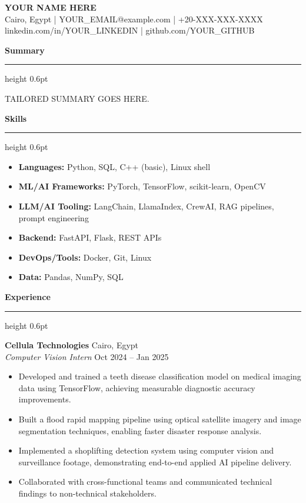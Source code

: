 \documentclass[10pt,a4paper]{article}
\newcommand{\href}[2]{#2}
\newcommand{\cvsection}[1]{%
  \vspace{2pt}%
  {\large\bfseries #1}\\[-4pt]%
  \hrule height 0.6pt%
  \vspace{2pt}%
}
\begin{document}
\small

\begin{center}
  {\LARGE\bfseries YOUR NAME HERE}\\[3pt]
  Cairo, Egypt \quad|\quad
  \href{mailto:YOUR_EMAIL@example.com}{YOUR\_EMAIL@example.com} \quad|\quad
  +20-XXX-XXX-XXXX \\
  \href{https://linkedin.com/in/YOUR_LINKEDIN}{linkedin.com/in/YOUR\_LINKEDIN} \quad|\quad
  \href{https://github.com/YOUR_GITHUB}{github.com/YOUR\_GITHUB}
\end{center}

\vspace{2pt}

\cvsection{Summary}


TAILORED SUMMARY GOES HERE.

\cvsection{Skills}

\begin{itemize}
  \item \textbf{Languages:} Python, SQL, C++ (basic), Linux shell
  \item \textbf{ML/AI Frameworks:} PyTorch, TensorFlow, scikit-learn, OpenCV
  \item \textbf{LLM/AI Tooling:} LangChain, LlamaIndex, CrewAI, RAG pipelines, prompt engineering
  \item \textbf{Backend:} FastAPI, Flask, REST APIs
  \item \textbf{DevOps/Tools:} Docker, Git, Linux
  \item \textbf{Data:} Pandas, NumPy, SQL
\end{itemize}

\cvsection{Experience}

\textbf{Cellula Technologies} \hfill Cairo, Egypt\\
\textit{Computer Vision Intern} \hfill Oct 2024 -- Jan 2025
\begin{itemize}
  \item Developed and trained a teeth disease classification model on medical imaging data using TensorFlow, achieving measurable diagnostic accuracy improvements.
  \item Built a flood rapid mapping pipeline using optical satellite imagery and image segmentation techniques, enabling faster disaster response analysis.
  \item Implemented a shoplifting detection system using computer vision and surveillance footage, demonstrating end-to-end applied AI pipeline delivery.
  \item Collaborated with cross-functional teams and communicated technical findings to non-technical stakeholders.
\end{itemize}
\end{document}

